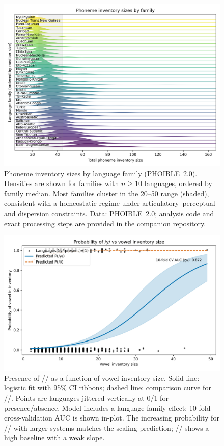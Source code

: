 \documentclass[12pt]{article}
\begin{document}
\begin{figure}[t]
  \centering
  \includegraphics[width=\linewidth]{images/inventory_ridgelines.png}
  \caption{Phoneme inventory sizes by language family (PHOIBLE~2.0).
  Densities are shown for families with $n \ge 10$ languages, ordered by family median.
  Most families cluster in the 20–50 range (shaded), consistent with a homeostatic regime under articulatory–perceptual and dispersion constraints.
  Data: PHOIBLE~2.0; analysis code and exact processing steps are provided in the companion repository.}
  \label{fig:ridgelines}
\end{figure}

\begin{figure}[t]
  \centering
  \includegraphics[width=\linewidth]{images/y_vs_vowel_inventory.png}
  \caption{Presence of // as a function of vowel-inventory size.
  Solid line: logistic fit with 95\% CI ribbons; dashed line: comparison curve for //.
  Points are languages jittered vertically at 0/1 for presence/absence.
  Model includes a language-family effect; 10-fold cross-validation AUC is shown in-plot.
  The increasing probability for // with larger systems matches the scaling prediction; // shows a high baseline with a weak slope.}
  \label{fig:y-scaling}
\end{figure}
\end{document}
